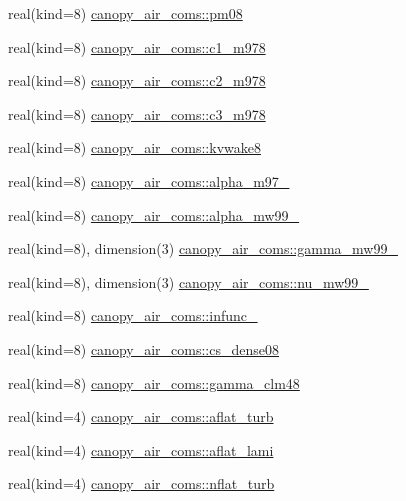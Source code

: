 \begin{DoxyCompactItemize}
\item 
real(kind=8) \hyperlink{namespacecanopy__air__coms_aa4901dce15fa74bcece60c3ddfaf5a7e}{canopy\+\_\+air\+\_\+coms\+::pm08}
\item 
real(kind=8) \hyperlink{namespacecanopy__air__coms_a767d679f796e74175138a9b4fad052df}{canopy\+\_\+air\+\_\+coms\+::c1\+\_\+m978}
\item 
real(kind=8) \hyperlink{namespacecanopy__air__coms_a20b553578d5e2da23387a3c814f19229}{canopy\+\_\+air\+\_\+coms\+::c2\+\_\+m978}
\item 
real(kind=8) \hyperlink{namespacecanopy__air__coms_a9be4a0dac0272c3475840eede662688d}{canopy\+\_\+air\+\_\+coms\+::c3\+\_\+m978}
\item 
real(kind=8) \hyperlink{namespacecanopy__air__coms_aea31639861943125d6b07627648637cf}{canopy\+\_\+air\+\_\+coms\+::kvwake8}
\item 
real(kind=8) \hyperlink{namespacecanopy__air__coms_aaca98abaf4f4ff986bd24a7e1ceea8a6}{canopy\+\_\+air\+\_\+coms\+::alpha\+\_\+m97\+\_}
\item 
real(kind=8) \hyperlink{namespacecanopy__air__coms_a0c11f06e8905d7442da34f32fd5a1f5d}{canopy\+\_\+air\+\_\+coms\+::alpha\+\_\+mw99\+\_}
\item 
real(kind=8), dimension(3) \hyperlink{namespacecanopy__air__coms_abfa660e21167dc9825089920687f3aae}{canopy\+\_\+air\+\_\+coms\+::gamma\+\_\+mw99\+\_}
\item 
real(kind=8), dimension(3) \hyperlink{namespacecanopy__air__coms_ae39097ce08183e89c3ed7ee9fba45cfb}{canopy\+\_\+air\+\_\+coms\+::nu\+\_\+mw99\+\_}
\item 
real(kind=8) \hyperlink{namespacecanopy__air__coms_a2b6e9200766e533bfa58ae0da840321e}{canopy\+\_\+air\+\_\+coms\+::infunc\+\_}
\item 
real(kind=8) \hyperlink{namespacecanopy__air__coms_a9f485b27a7dceff879db585b90660457}{canopy\+\_\+air\+\_\+coms\+::cs\+\_\+dense08}
\item 
real(kind=8) \hyperlink{namespacecanopy__air__coms_ab14ce7f9e39fec25d950aa20ea6ca28b}{canopy\+\_\+air\+\_\+coms\+::gamma\+\_\+clm48}
\item 
real(kind=4) \hyperlink{namespacecanopy__air__coms_a63aa3cee74a44dfccdad43b566c7149c}{canopy\+\_\+air\+\_\+coms\+::aflat\+\_\+turb}
\item 
real(kind=4) \hyperlink{namespacecanopy__air__coms_a478fe27fc0f34c4b09208d0f99bae8e5}{canopy\+\_\+air\+\_\+coms\+::aflat\+\_\+lami}
\item 
real(kind=4) \hyperlink{namespacecanopy__air__coms_a73459e396f65a6dd6e485d7ec6256a4c}{canopy\+\_\+air\+\_\+coms\+::nflat\+\_\+turb}

\end{DoxyCompactItemize}
